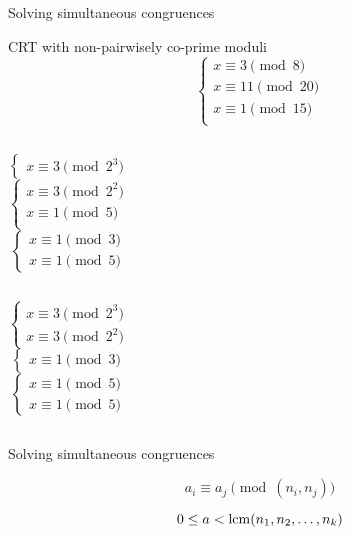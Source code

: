 \begin{frame}{Solving simultaneous congruences}
  \begin{exampleblock}{CRT with non-pairwisely co-prime moduli}
	\[
	  \begin{cases}
		x \equiv 3 \pmod{8} \\
		x \equiv 11 \pmod{20} \\
		x \equiv 1 \pmod{15} \\
	  \end{cases}
	\]
  \end{exampleblock}

  \begin{columns}
	  \pause
	  \[
		\begin{cases}
		  x \equiv 3 \pmod{2^3}
		\end{cases}
	  \]
	  \pause
	  \[
		\begin{cases}
		  x \equiv 3 \pmod{2^2} \\
		  x \equiv 1 \pmod{5} \\
		\end{cases}
	  \]
	  \pause
	  \[
		\begin{cases}
		  x \equiv 1 \pmod{3} \\
		  x \equiv 1 \pmod{5}
		\end{cases}
	  \]
  \end{columns}

  \begin{columns}
	  \pause
	  \[
		\begin{cases}
		  x \equiv 3 \pmod{2^3} \\
		  x \equiv 3 \pmod{2^2}
		\end{cases}
	  \]
	  \pause
	  \[
		\begin{cases}
		  x \equiv 1 \pmod{3}
		\end{cases}
	  \]
	  \pause
	  \[
		\begin{cases}
		  x \equiv 1 \pmod{5} \\
		  x \equiv 1 \pmod{5}
		\end{cases}
	  \]
  \end{columns}
\end{frame}
\begin{frame}{Solving simultaneous congruences}
  \begin{theorem}
	\[
	  a_i \equiv a_j \pmod{(n_i, n_j)}
	\]

	\[
	  0 \le a < \operatorname{lcm}(n_1, n_2, \ldots, n_k)
	\]
  \end{theorem}
\end{frame}
